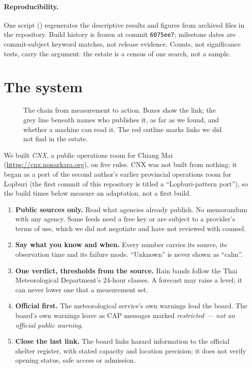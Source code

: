 \documentclass[10pt,twocolumn,a4paper]{article}
\newcommand{\kw}[1]{\textbf{#1}}
\begin{document}
\paragraph{Reproducibility.} One script () regenerates the descriptive results and figures from archived files in the repository. Build history is frozen at commit \texttt{6075ee7}; milestone dates are commit-subject keyword matches, not release evidence. Counts, not significance tests, carry the argument: the estate is a census of one search, not a sample.

\section{The system}
\label{sec:system}
\begin{figure}[!t]
\centering
\resizebox{\textwidth}{!}{}
\caption{The chain from measurement to action. Boxes show the link; the grey line beneath names who publishes it, as far as we found, and whether a machine can read it. The red outline marks links we did not find in the estate.}\label{fig:chain}
\end{figure}
We built \emph{CNX}, a public operations room for Chiang Mai (\url{https://cnx.nonarkara.org}), on five rules. CNX was not built from nothing: it began as a port of the second author\textquoteright s earlier provincial operations room for Lopburi (the first commit of this repository is titled a ``Lopburi-pattern port''), so the build times below measure an adaptation, not a first build.
\begin{enumerate}
\item \kw{Public sources only.} Read what agencies already publish. No memorandum with any agency. Some feeds need a free key or are subject to a provider\textquoteright s terms of use, which we did not negotiate and have not reviewed with counsel.
\item \kw{Say what you know and when.} Every number carries its source, its observation time and its failure mode. ``Unknown'' is never shown as ``calm''.
\item \kw{One verdict, thresholds from the source.} Rain bands follow the Thai Meteorological Department's 24-hour classes. A forecast may raise a level; it can never lower one that a measurement set.
\item \kw{Official first.} The meteorological service's own warnings lead the board. The board's own warnings leave as CAP messages marked \emph{restricted --- not an official public warning}.
\item \kw{Close the last link.} The board links hazard information to the official shelter register, with stated capacity and location precision; it does not verify opening status, safe access or admission.
\end{enumerate}
\end{document}
